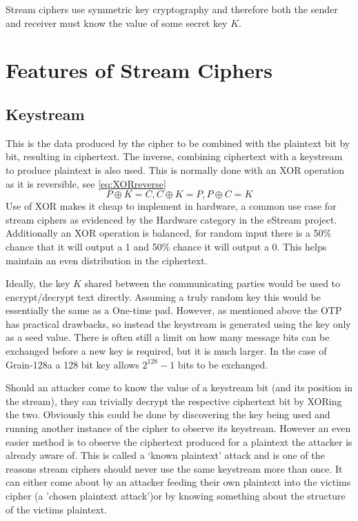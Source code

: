 \documentclass{report}
\let\Oldsection\section
\renewcommand{\section}{\FloatBarrier\Oldsection}
\let\Oldsubsection\subsection
\renewcommand{\subsection}{\FloatBarrier\Oldsubsection}
\begin{document}
Stream ciphers use symmetric key cryptography and therefore both the sender and receiver must know the value of some secret key $K$.
\newpage
\section{Features of Stream Ciphers}
\subsection{Keystream}
This is the data produced by the cipher to be combined with the plaintext bit by bit, resulting in ciphertext. The inverse, combining ciphertext with a keystream to produce plaintext is also used. This is normally done with an XOR operation as it is reversible, see \ref{eq:XORreverse}
\begin{equation}
P \oplus K=C, C \oplus K=P, P \oplus C = K
\label{eq:XORreverse}
\end{equation}
Use of XOR makes it cheap to implement in hardware, a common use case for stream ciphers as evidenced by the Hardware category in the eStream project\cite{eStreamPort}. Additionally an XOR operation is balanced, for random input there is a 50\% chance that it will output a 1 and 50\% chance it will output a 0. This helps maintain an even distribution in the ciphertext.

Ideally, the key $K$ shared between the communicating parties would be used to encrypt/decrypt text directly. Assuming a truly random key this would be essentially the same as a One-time pad. However, as mentioned above the OTP has practical drawbacks, so instead the keystream is generated using the key only as a seed value. There is often still a limit on how many message bits can be exchanged before a new key is required, but it is much larger. In the case of Grain-128a a 128 bit key allows $2^{128}-1$ bits to be exchanged\cite{Grain128aSpec}.

Should an attacker come to know the value of a keystream bit (and its position in the stream), they can trivially decrypt the respective ciphertext bit by XORing the two. Obviously this could be done by discovering the key being used and running another instance of the cipher to observe its keystream. However an even easier method is to observe the ciphertext produced for a plaintext the attacker is already aware of. This is called a `known plaintext' attack\cite{plaintextAttack} and is one of the reasons stream ciphers should never use the same keystream more than once. It can either come about by an attacker feeding their own plaintext into the victims cipher (a 'chosen plaintext attack')or by knowing something about the structure of the victims plaintext.
\end{document}
